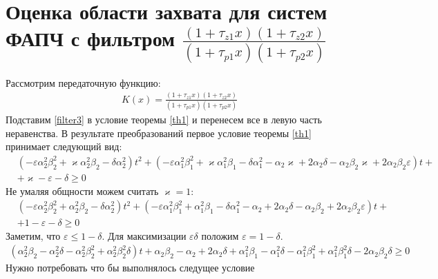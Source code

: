 \documentclass[a4paper,14pt]{extarticle} %
\begin{document}
\section{Оценка области захвата для систем ФАПЧ с фильтром $\frac{(1+\tau_{z1}x)(1+\tau_{z2}x)}{(1+\tau_{p1}x)(1+\tau_{p2}x)}$}
 Рассмотрим передаточную функцию:
 \begin{equation}\label{filter3}
 \begin{aligned}
K(x) = \frac{(1+\tau_{z1}x)(1+\tau_{z2}x)}{(1+\tau_{p1}x)(1+\tau_{p2}x)}
 \end{aligned}
\end{equation}
Подставим \eqref{filter3} в условие теоремы \ref{th1} и перенесем все в левую часть неравенства. В результате преобразований первое условие теоремы \ref{th1} принимает следующий вид:
 \begin{equation}
 \begin{aligned}
&(-\varepsilon\alpha_2^2\beta_2^2 + \varkappa\alpha_2^2\beta_2 - \delta\alpha_2^2)t^2 + (-\varepsilon\alpha_1^2\beta_1^2 + \varkappa\alpha_1^2\beta_1 - \delta\alpha_1^2 - \alpha_2\varkappa + 2\alpha_2\delta - \alpha_2\beta_2\varkappa + 2\alpha_2\beta_2\varepsilon)t +\\
& + \varkappa - \varepsilon - \delta \geq 0
 \end{aligned}
\end{equation}
Не умаляя общности можем считать $\varkappa = 1$:
 \begin{equation}
 \begin{aligned}
&(-\varepsilon\alpha_2^2\beta_2^2 + \alpha_2^2\beta_2 - \delta\alpha_2^2)t^2 + (-\varepsilon\alpha_1^2\beta_1^2 + \alpha_1^2\beta_1 - \delta\alpha_1^2 - \alpha_2 + 2\alpha_2\delta - \alpha_2\beta_2 + 2\alpha_2\beta_2\varepsilon)t +\\
& + 1 - \varepsilon - \delta \geq 0
 \end{aligned}
\end{equation}
Заметим, что $\varepsilon \leq 1 - \delta$. Для максимизации $\varepsilon\delta$ положим $\varepsilon = 1-\delta$.
 \begin{equation}
 \begin{aligned}
(\alpha_2^2\beta_2 - \alpha_2^2\delta - \alpha_2^2\beta_2^2 + \alpha_2^2\beta_2^2\delta)t + \alpha_2\beta_2 - \alpha_2 + 2\alpha_2\delta + \alpha_1^2\beta_1 - \alpha_1^2\delta - \alpha_1^2\beta_1^2 + \alpha_1^2\beta_1^2\delta - 2\alpha_2\beta_2\delta \geq 0
 \end{aligned}
\end{equation}
Нужно потребовать что бы выполнялось следущее условие
\end{document}
